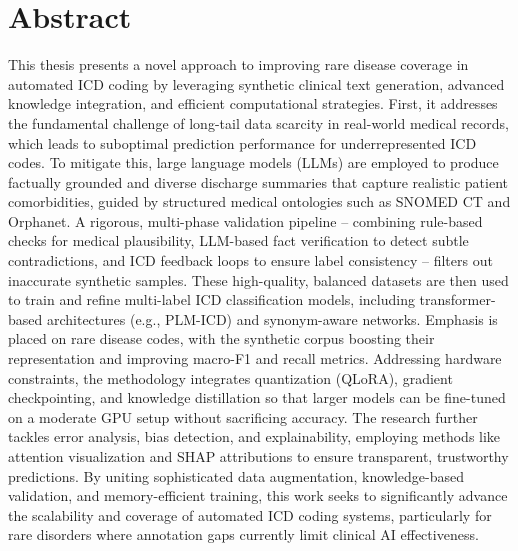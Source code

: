 \chapter*{Abstract}
\label{chap:abstract}

This thesis presents a novel approach to improving rare disease coverage in automated ICD coding by leveraging synthetic clinical text generation, advanced knowledge integration, and efficient computational strategies. First, it addresses the fundamental challenge of long-tail data scarcity in real-world medical records, which leads to suboptimal prediction performance for underrepresented ICD codes. To mitigate this, large language models (LLMs) are employed to produce factually grounded and diverse discharge summaries that capture realistic patient comorbidities, guided by structured medical ontologies such as SNOMED CT and Orphanet. A rigorous, multi-phase validation pipeline – combining rule-based checks for medical plausibility, LLM-based fact verification to detect subtle contradictions, and ICD feedback loops to ensure label consistency – filters out inaccurate synthetic samples. These high-quality, balanced datasets are then used to train and refine multi-label ICD classification models, including transformer-based architectures (e.g., PLM-ICD) and synonym-aware networks. Emphasis is placed on rare disease codes, with the synthetic corpus boosting their representation and improving macro-F1 and recall metrics. Addressing hardware constraints, the methodology integrates quantization (QLoRA), gradient checkpointing, and knowledge distillation so that larger models can be fine-tuned on a moderate GPU setup without sacrificing accuracy. The research further tackles error analysis, bias detection, and explainability, employing methods like attention visualization and SHAP attributions to ensure transparent, trustworthy predictions. By uniting sophisticated data augmentation, knowledge-based validation, and memory-efficient training, this work seeks to significantly advance the scalability and coverage of automated ICD coding systems, particularly for rare disorders where annotation gaps currently limit clinical AI effectiveness.

